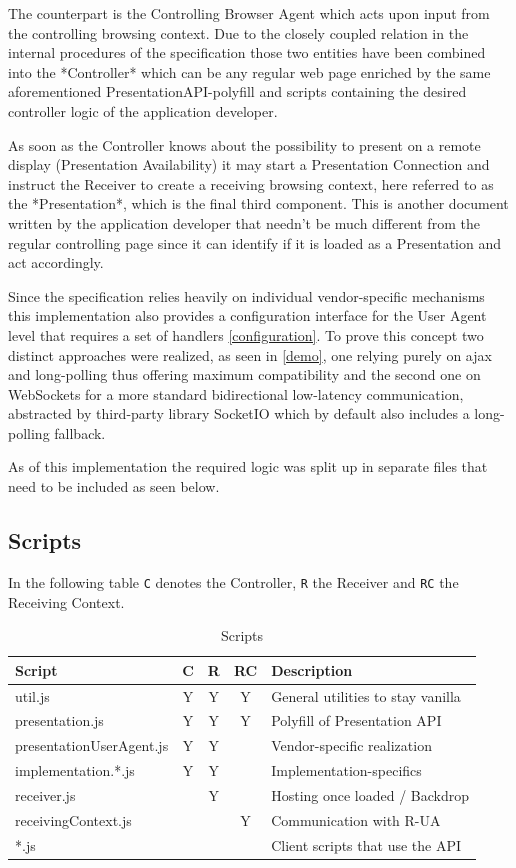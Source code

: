 \documentclass[journal]{IEEEtran}
\begin{document}
The counterpart is the Controlling Browser Agent which acts upon input from the controlling browsing context. Due to the closely coupled relation in the internal procedures of the specification those two entities have been combined into the *Controller* which can be any regular web page enriched by the same aforementioned PresentationAPI-polyfill and scripts containing the desired controller logic of the application developer.

As soon as the Controller knows about the possibility to present on a remote display (Presentation Availability) it may start a Presentation Connection and instruct the Receiver to create a receiving browsing context, here referred to as the *Presentation*, which is the final third component. This is another document written by the application developer that needn't be much different from the regular controlling page since it can identify if it is loaded as a Presentation and act accordingly.

Since the specification relies heavily on individual vendor-specific mechanisms this implementation also provides a configuration interface for the User Agent level that requires a set of handlers \ref{configuration}. To prove this concept two distinct approaches were realized, as seen in  \ref{demo}, one relying purely on ajax and long-polling thus offering maximum compatibility and the second one on WebSockets for a more standard bidirectional low-latency communication, abstracted by third-party library SocketIO which by default also includes a long-polling fallback.

As of this implementation the required logic was split up in separate files that need to be included as seen below.
\subsection{Scripts}
\label{scripts}
In the following table  {\lstinline[style=inline]$C$} denotes the Controller,  {\lstinline[style=inline]$R$} the Receiver and  {\lstinline[style=inline]$RC$} the Receiving Context.

\begin{table}[!ht]\caption{Scripts}\label{scripts}
\centering\begin{tabular}{|l|c|c|c|l|}
\hline 
Script & C & R & RC & Description\\
\hline 
util.js & Y & Y & Y & General utilities to stay vanilla\\
\hline 
presentation.js & Y & Y & Y & Polyfill of Presentation API\\
\hline 
presentationUserAgent.js & Y & Y &  & Vendor-specific realization\\
\hline 
implementation.*.js & Y & Y &  & Implementation-specifics\\
\hline 
receiver.js &  & Y &  & Hosting once loaded / Backdrop\\
\hline 
receivingContext.js &  &  & Y & Communication with R-UA\\
\hline 
*.js &  &  &  & Client scripts that use the API\\
\hline 
\end{tabular} 
\end{table}
\end{document}
